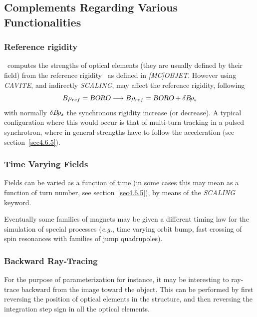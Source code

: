\subsection{Complements Regarding Various Functionalities} \label{sec4.6}  


\subsubsection{Reference rigidity}  \label{sec4.6.RefBORO} 

\zgoubi\ computes the strengths of optical elements (they are usually defined by their field) from the reference 
rigidity \BORO\ as defined in \textsl{[MC]OBJET}. However using \textsl{CAVITE}, and indirectly \textsl{SCALING},  
may affect the reference rigidity, following 
$$B\rho_{ref} = \textsl{BORO} \longrightarrow B\rho_{ref} = \textsl{BORO} + \delta B\!\rho_s$$ 
\noindent with normally $\delta B\!\rho_s$ the synchronous rigidity increase (or decrease). A typical configuration where this would 
occur is that of multi-turn tracking in a pulsed synchrotron, where in general strengths have to follow the  
acceleration (see section~\ref{sec4.6.5}). 



\subsubsection{Time Varying Fields} \label{sec4.6.TimeVFields} 

Fields can be varied as a function of time  (in some cases this may mean as a function of turn number, 
see section~\ref{sec4.6.5}), by means of the  \textsl{SCALING} keyword. 

\medskip

\noindent Eventually some families of magnets may be given a different timing law 
    for the simulation of special processes (\emph{e.g.}, time varying orbit bump, 
fast crossing of spin resonances with families of jump quadrupoles). 


\subsubsection{Backward Ray-Tracing} \label{sec4.6.3} 
 

For the purpose of parameterization for instance, it may be interesting to ray-trace 
backward  from the image toward the object.  This can be performed by first 
reversing the position of optical elements in the structure, and then 
reversing the integration step sign in all the optical elements.  
\medskip

